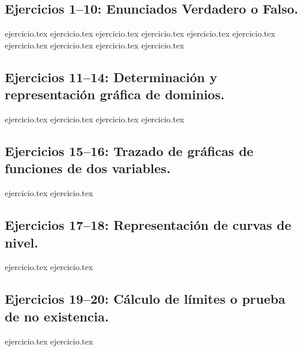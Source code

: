 
\subsection*{Ejercicios 1--10: Enunciados Verdadero o Falso.}
\begin{enumerate}
    {ejercicio.tex}
    {ejercicio.tex}
    {ejercicio.tex}
    {ejercicio.tex}
    {ejercicio.tex}
    {ejercicio.tex}
    {ejercicio.tex}
    {ejercicio.tex}
    {ejercicio.tex}
    {ejercicio.tex}
\end{enumerate}

\subsection*{Ejercicios 11--14: Determinación y representación gráfica de dominios.}
\begin{enumerate}
    \setcounter{enumi}{10}
    {ejercicio.tex}
    {ejercicio.tex}
    {ejercicio.tex}
    {ejercicio.tex}
\end{enumerate}

\subsection*{Ejercicios 15--16: Trazado de gráficas de funciones de dos variables.}
\begin{enumerate}
    \setcounter{enumi}{14}
    {ejercicio.tex}
    {ejercicio.tex}
\end{enumerate}

\subsection*{Ejercicios 17--18: Representación de curvas de nivel.}
\begin{enumerate}
    \setcounter{enumi}{16}
    {ejercicio.tex}
    {ejercicio.tex}
\end{enumerate}

\subsection*{Ejercicios 19--20: Cálculo de límites o prueba de no existencia.}
\begin{enumerate}
    \setcounter{enumi}{18}
    {ejercicio.tex}
    {ejercicio.tex}
\end{enumerate}


